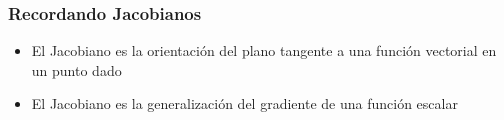 \begin{frame}
    \frametitle{Recordando Jacobianos}
   
    \begin{itemize}
        \item El Jacobiano es la orientación del plano tangente a una función vectorial en un punto dado
        \item El Jacobiano es la generalización del gradiente de una función escalar
    \end{itemize}

    \begin{figure}[!h]
        \centering
        \hspace{1cm} 
    \end{figure}

    \begin{center}
    \end{center}


\end{frame}


